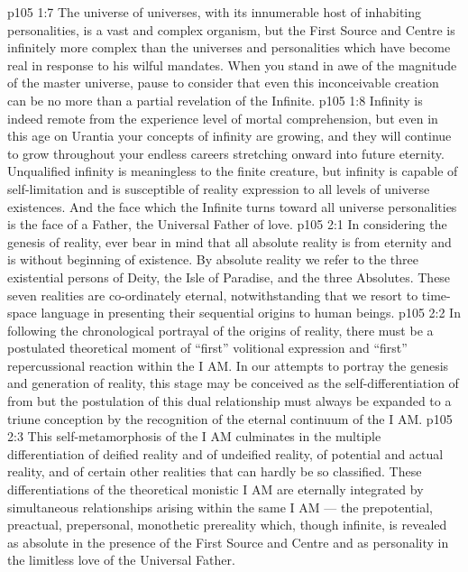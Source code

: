 \vs p105 1:7 The universe of universes, with its innumerable host of inhabiting personalities, is a vast and complex organism, but the First Source and Centre is infinitely more complex than the universes and personalities which have become real in response to his wilful mandates. When you stand in awe of the magnitude of the master universe, pause to consider that even this inconceivable creation can be no more than a partial revelation of the Infinite.
\vs p105 1:8 Infinity is indeed remote from the experience level of mortal comprehension, but even in this age on Urantia your concepts of infinity are growing, and they will continue to grow throughout your endless careers stretching onward into future eternity. Unqualified infinity is meaningless to the finite creature, but infinity is capable of self\hyp{}limitation and is susceptible of reality expression to all levels of universe existences. And the face which the Infinite turns toward all universe personalities is the face of a Father, the Universal Father of love.
\vs p105 2:1 In considering the genesis of reality, ever bear in mind that all absolute reality is from eternity and is without beginning of existence. By absolute reality we refer to the three existential persons of Deity, the Isle of Paradise, and the three Absolutes. These seven realities are co\hyp{}ordinately eternal, notwithstanding that we resort to time\hyp{}space language in presenting their sequential origins to human beings.
\vs p105 2:2 \pc In following the chronological portrayal of the origins of reality, there must be a postulated theoretical moment of “first” volitional expression and “first” repercussional reaction within the I AM. In our attempts to portray the genesis and generation of reality, this stage may be conceived as the self\hyp{}differentiation of  from  but the postulation of this dual relationship must always be expanded to a triune conception by the recognition of the eternal continuum of  the I AM.
\vs p105 2:3 This self\hyp{}metamorphosis of the I AM culminates in the multiple differentiation of deified reality and of undeified reality, of potential and actual reality, and of certain other realities that can hardly be so classified. These differentiations of the theoretical monistic I AM are eternally integrated by simultaneous relationships arising within the same I AM --- the prepotential, preactual, prepersonal, monothetic prereality which, though infinite, is revealed as absolute in the presence of the First Source and Centre and as personality in the limitless love of the Universal Father.
